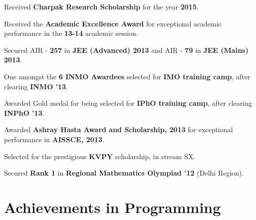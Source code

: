 \documentclass[a4paper]{norm-resume}
\begin{document}
\begin{tightitemize}
	\item Received \textbf{Charpak Research Scholarship} for the year \textbf{2015}.
	\item Received the \textbf{Academic Excellence Award} for exceptional academic performance in the \textbf{13-14} academic session.
	\item Secured AIR - \textbf{257} in {\textbf{JEE (Advanced) 2013}} and AIR - {\textbf{79}} in \textbf{JEE (Mains) 2013}.
	\item One amongst the \textbf{6 INMO Awardees} selected for \textbf{IMO training camp}, after clearing \textbf{INMO '13}.
	\item Awarded Gold medal for being selected for \textbf{IPhO training camp}, after clearing \textbf{INPhO '13}.
	\item Awarded \textbf{Ashray Hasta Award and Scholarship, 2013} for exceptional performance in \textbf{AISSCE, 2013}.
	\item Selected for the prestigious \textbf{KVPY} scholarship, in stream SX.
	\item Secured \textbf{Rank 1} in \textbf{Regional Mathematics Olympiad '12} (Delhi Region).	
\end{tightitemize}
	
\vspace{1mm}	%


\section{Achievements in Programming}

\vspace{3mm} %
\end{document}
